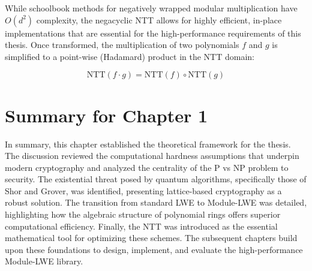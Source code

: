 While schoolbook methods for negatively wrapped modular multiplication have $O(d^2)$ complexity, the negacyclic NTT allows for highly efficient, in-place implementations that are essential for the high-performance requirements of this thesis.
Once transformed, the multiplication of two polynomials $f$ and $g$ is simplified to a point-wise (Hadamard) product in the NTT domain:

\begin{equation}
    \label{eq:ntt_convolution}
    \text{NTT}(f \cdot g) = \text{NTT}(f) \circ \text{NTT}(g)
\end{equation}

\section{Summary for Chapter 1}
\label{sec:summary_chapter_1}

In summary, this chapter established the theoretical framework for the thesis. The discussion reviewed the computational hardness assumptions that underpin modern cryptography and analyzed the centrality of the P vs NP problem to security. The existential threat posed by quantum algorithms, specifically those of Shor and Grover, was identified, presenting lattice-based cryptography as a robust solution. The transition from standard LWE to Module-LWE was detailed, highlighting how the algebraic structure of polynomial rings offers superior computational efficiency. Finally, the NTT was introduced as the essential mathematical tool for optimizing these schemes. The subsequent chapters build upon these foundations to design, implement, and evaluate the high-performance Module-LWE library.
